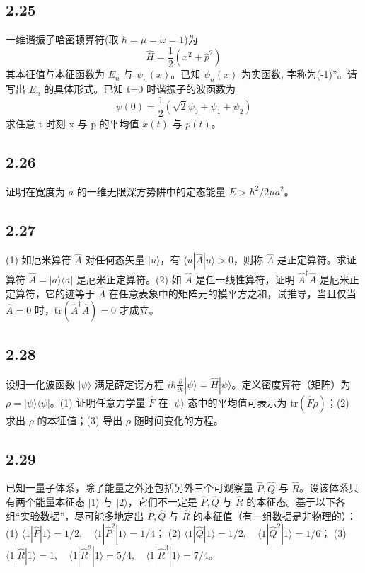 \subsection{2.25}
一维谐振子哈密顿算符(取 $\hbar = \mu = \omega = 1$)为
$$\hat{H} = \frac{1}{2}(x^2 + \hat{p}^2)$$
其本征值与本征函数为 $E_n$ 与 $\psi_n(x)$。已知 $\psi_n(x)$ 为实函数, 字称为(-1)”。请写出 $E_n$ 的具体形式。已知 t=0 时谐振子的波函数为
$$\psi(0) = \frac{1}{2} \left( \sqrt{2}\psi_0 + \psi_1 + \psi_2 \right)$$
求任意 t 时刻 x 与 p 的平均值 $\overline{x(t)}$ 与 $\overline{p(t)}$。

\subsection{2.26}
证明在宽度为 $a$ 的一维无限深方势阱中的定态能量 $E > \hbar^2 / 2 \mu a^2$。

\subsection{2.27}
(1) 如厄米算符 $\hat{A}$ 对任何态矢量 $|u\rangle$，有 $\langle u|\hat{A}|u\rangle > 0$，则称 $\hat{A}$ 是正定算符。求证算符 $\hat{A} = |a\rangle \langle a|$ 是厄米正定算符。(2) 如 $\hat{A}$ 是任一线性算符，证明 $\hat{A}^{\dagger} \hat{A}$ 是厄米正定算符，它的迹等于 $\hat{A}$ 在任意表象中的矩阵元的模平方之和，试推导，当且仅当 $\hat{A} = 0$ 时，tr$(\hat{A}^{\dagger} \hat{A}) = 0$ 才成立。

\subsection{2.28}
设归一化波函数 $|\psi\rangle$ 满足薛定谔方程 $i \hbar \frac{\partial}{\partial t} |\psi\rangle = \hat{H} |\psi\rangle$。定义密度算符（矩阵）为 $\rho = |\psi\rangle \langle \psi|$。(1) 证明任意力学量 $\hat{F}$ 在 $|\psi\rangle$ 态中的平均值可表示为 tr$(\hat{F}\rho)$；(2) 求出 $\rho$ 的本征值；(3) 导出 $\rho$ 随时间变化的方程。

\subsection{2.29}
已知一量子体系，除了能量之外还包括另外三个可观察量 $\hat{P}, \hat{Q}$ 与 $\hat{R}$。设该体系只有两个能量本征态 $|1\rangle$ 与 $|2\rangle$，它们不一定是 $\hat{P}, \hat{Q}$ 与 $\hat{R}$ 的本征态。基于以下各组“实验数据”，尽可能多地定出 $\hat{P}, \hat{Q}$ 与 $\hat{R}$ 的本征值（有一组数据是非物理的）：
(1) $\langle 1|\hat{P}|1\rangle = 1/2, \quad \langle 1|\hat{P}^2|1\rangle = 1/4$；
(2) $\langle 1|\hat{Q}|1\rangle = 1/2, \quad \langle 1|\hat{Q}^2|1\rangle = 1/6$；
(3) $\langle 1|\hat{R}|1\rangle = 1, \quad \langle 1|\hat{R}^2|1\rangle = 5/4, \quad \langle 1|\hat{R}^3|1\rangle = 7/4$。


